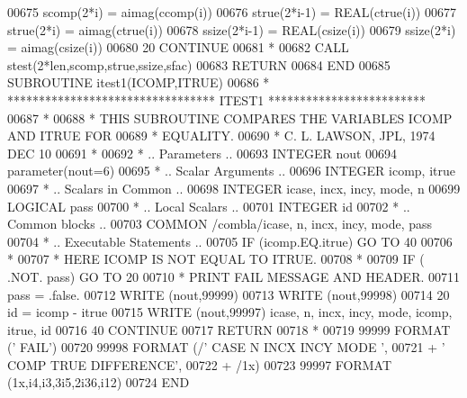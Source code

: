 \begin{DoxyCode}
00675          scomp(2*i) = aimag(ccomp(i))
00676          strue(2*i-1) = \textcolor{keywordtype}{REAL}(ctrue(i))
00677          strue(2*i) = aimag(ctrue(i))
00678          ssize(2*i-1) = \textcolor{keywordtype}{REAL}(csize(i))
00679          ssize(2*i) = aimag(csize(i))
00680    20 \textcolor{keywordflow}{CONTINUE}
00681 \textcolor{comment}{*}
00682       \textcolor{keyword}{CALL }stest(2*len,scomp,strue,ssize,sfac)
00683       \textcolor{keywordflow}{RETURN}
00684 \textcolor{keyword}{      END}
00685 \textcolor{keyword}{      SUBROUTINE }itest1(ICOMP,ITRUE)
00686 \textcolor{comment}{*     ********************************* ITEST1 *************************}
00687 \textcolor{comment}{*}
00688 \textcolor{comment}{*     THIS SUBROUTINE COMPARES THE VARIABLES ICOMP AND ITRUE FOR}
00689 \textcolor{comment}{*     EQUALITY.}
00690 \textcolor{comment}{*     C. L. LAWSON, JPL, 1974 DEC 10}
00691 \textcolor{comment}{*}
00692 \textcolor{comment}{*     .. Parameters ..}
00693       \textcolor{keywordtype}{INTEGER}           nout
00694       parameter(nout=6)
00695 \textcolor{comment}{*     .. Scalar Arguments ..}
00696       \textcolor{keywordtype}{INTEGER}           icomp, itrue
00697 \textcolor{comment}{*     .. Scalars in Common ..}
00698       \textcolor{keywordtype}{INTEGER}           icase, incx, incy, mode, n
00699       \textcolor{keywordtype}{LOGICAL}           pass
00700 \textcolor{comment}{*     .. Local Scalars ..}
00701       \textcolor{keywordtype}{INTEGER}           id
00702 \textcolor{comment}{*     .. Common blocks ..}
00703       \textcolor{keyword}{COMMON}            /combla/icase, n, incx, incy, mode, pass
00704 \textcolor{comment}{*     .. Executable Statements ..}
00705       \textcolor{keywordflow}{IF} (icomp.EQ.itrue) \textcolor{keywordflow}{GO TO} 40
00706 \textcolor{comment}{*}
00707 \textcolor{comment}{*                            HERE ICOMP IS NOT EQUAL TO ITRUE.}
00708 \textcolor{comment}{*}
00709       \textcolor{keywordflow}{IF} ( .NOT. pass) \textcolor{keywordflow}{GO TO} 20
00710 \textcolor{comment}{*                             PRINT FAIL MESSAGE AND HEADER.}
00711       pass = .false.
00712       \textcolor{keyword}{WRITE} (nout,99999)
00713       \textcolor{keyword}{WRITE} (nout,99998)
00714    20 id = icomp - itrue
00715       \textcolor{keyword}{WRITE} (nout,99997) icase, n, incx, incy, mode, icomp, itrue, id
00716    40 \textcolor{keywordflow}{CONTINUE}
00717       \textcolor{keywordflow}{RETURN}
00718 \textcolor{comment}{*}
00719 99999 \textcolor{keyword}{FORMAT} (\textcolor{stringliteral}{'                                       FAIL'})
00720 99998 \textcolor{keyword}{FORMAT} (/\textcolor{stringliteral}{' CASE  N INCX INCY MODE                               '},
00721      +       \textcolor{stringliteral}{' COMP                                TRUE     DIFFERENCE'},
00722      +       /1x)
00723 99997 \textcolor{keyword}{FORMAT} (1x,i4,i3,3i5,2i36,i12)
00724 \textcolor{keyword}{      END}
\end{DoxyCode}
